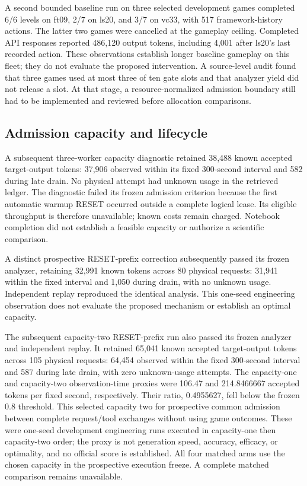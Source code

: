 \documentclass[11pt]{article}
\begin{document}
A second bounded baseline run on three selected development games completed 6/6 levels on ft09, 2/7 on ls20, and 3/7 on vc33, with 517 framework-history actions. The latter two games were cancelled at the gameplay ceiling. Completed API responses reported 486,120 output tokens, including 4,001 after ls20's last recorded action. These observations establish longer baseline gameplay on this fleet; they do not evaluate the proposed intervention. A source-level audit found that three games used at most three of ten gate slots and that analyzer yield did not release a slot. At that stage, a resource-normalized admission boundary still had to be implemented and reviewed before allocation comparisons.

\subsection{Admission capacity and lifecycle}
A subsequent three-worker capacity diagnostic retained 38,488 known accepted target-output tokens: 37,906 observed within its fixed 300-second interval and 582 during late drain. No physical attempt had unknown usage in the retrieved ledger. The diagnostic failed its frozen admission criterion because the first automatic warmup RESET occurred outside a complete logical lease. Its eligible throughput is therefore unavailable; known costs remain charged. Notebook completion did not establish a feasible capacity or authorize a scientific comparison.

A distinct prospective RESET-prefix correction subsequently passed its frozen analyzer, retaining 32,991 known tokens across 80 physical requests: 31,941 within the fixed interval and 1,050 during drain, with no unknown usage. Independent replay reproduced the identical analysis. This one-seed engineering observation does not evaluate the proposed mechanism or establish an optimal capacity.

The subsequent capacity-two RESET-prefix run also passed its frozen analyzer and independent replay. It retained 65,041 known accepted target-output tokens across 105 physical requests: 64,454 observed within the fixed 300-second interval and 587 during late drain, with zero unknown-usage attempts. The capacity-one and capacity-two observation-time proxies were 106.47 and 214.8466667 accepted tokens per fixed second, respectively. Their ratio, 0.4955627, fell below the frozen 0.8 threshold. This selected capacity two for prospective common admission between complete request/tool exchanges without using game outcomes. These were one-seed development engineering runs executed in capacity-one then capacity-two order; the proxy is not generation speed, accuracy, efficacy, or optimality, and no official score is established. All four matched arms use the chosen capacity in the prospective execution freeze. A complete matched comparison remains unavailable.
\end{document}
